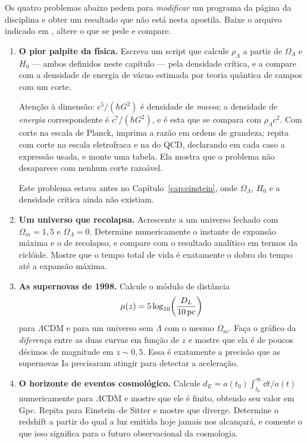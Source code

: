 \documentclass[12pt,a4paper,oneside]{book}
\theoremstyle{rgplain}
\theoremstyle{rgremark}
\begin{document}
Os quatro problemas abaixo pedem para \emph{modificar} um programa da página da disciplina e obter um resultado que não está nesta apostila. Baixe o arquivo indicado em \href{\rgsitecodigos}{\texttt{\rgsitecodigos}}, altere o que se pede e compare.

\begin{enumerate}

  \item \textbf{O pior palpite da física.} Escreva um script que calcule
$\rho_\Lambda$ a partir de $\Omega_\Lambda$ e $H_0$ --- ambos definidos
neste capítulo --- pela densidade crítica, e a compare com a densidade de
energia de vácuo estimada por teoria quântica de campos com um corte.

Atenção à dimensão: $c^5/(\hbar G^2)$ é densidade de \emph{massa}; a
densidade de \emph{energia} correspondente é $c^7/(\hbar G^2)$, e é esta que
se compara com $\rho_\Lambda c^2$. Com corte na escala de Planck, imprima a
razão em ordens de grandeza; repita com corte na escala eletrofraca e na do
QCD, declarando em cada caso a expressão usada, e monte uma tabela. Ela
mostra que o problema não desaparece com nenhum corte razoável.

Este problema estava antes no Capítulo~\ref{cap:einstein}, onde
$\Omega_\Lambda$, $H_0$ e a densidade crítica ainda não existiam.
  \item \textbf{Um universo que recolapsa.} Acrescente a
 um universo fechado com $\Omega_m=1{,}5$ e
$\Omega_\Lambda=0$. Determine numericamente o instante de expansão máxima e
o de recolapso, e compare com o resultado analítico em termos da ciclóide.
Mostre que o tempo total de vida é exatamente o dobro do tempo até a
expansão máxima.

  \item \textbf{As supernovas de 1998.} Calcule o módulo de distância
\[
  \mu(z)=5\log_{10}\!\left(\frac{D_L}{10\,{\rm pc}}\right)
\]
para $\Lambda$CDM e para um universo sem $\Lambda$ com o mesmo $\Omega_m$. Faça o gráfico da \emph{diferença}
entre as duas curvas em função de $z$ e mostre que ela é de poucos décimos
de magnitude em $z\sim0{,}5$. Essa é exatamente a precisão que as supernovas
Ia precisaram atingir para detectar a aceleração.

  \item \textbf{O horizonte de eventos cosmológico.} Calcule
$d_E = a(t_0)\int_{t_0}^{\infty}\dd t/a(t)$ numericamente para
$\Lambda$CDM e mostre que ele é finito, obtendo seu valor em Gpc. Repita
para Einstein--de Sitter e mostre que diverge. Determine o redshift a partir
do qual a luz emitida hoje jamais nos alcançará, e comente o que isso
significa para o futuro observacional da cosmologia.
\end{enumerate}
\end{document}

